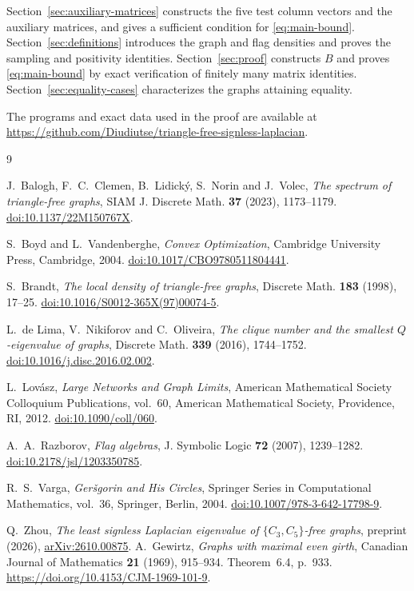 \documentclass[11pt]{article}
\begin{document}
Section~\ref{sec:auxiliary-matrices} constructs the five test column
vectors and the auxiliary matrices, and gives a sufficient condition
for \eqref{eq:main-bound}.
Section~\ref{sec:definitions} introduces the graph and flag densities
and proves the sampling and positivity identities.
Section~\ref{sec:proof} constructs $B$ and proves
\eqref{eq:main-bound} by exact verification of finitely many matrix
identities.
Section~\ref{sec:equality-cases} characterizes the graphs attaining equality.

The programs and exact data used in the proof are available at\newline
\url{https://github.com/Diudiutse/triangle-free-signless-laplacian}.





\FloatBarrier

\begin{thebibliography}{9}
\raggedright
{}
J.~Balogh, F.~C.~Clemen, B.~Lidick\'y, S.~Norin and J.~Volec,
\emph{The spectrum of triangle-free graphs},
SIAM J. Discrete Math. \textbf{37} (2023), 1173--1179.
\href{https://doi.org/10.1137/22M150767X}{doi:10.1137/22M150767X}.

S.~Boyd and L.~Vandenberghe, \emph{Convex Optimization},
Cambridge University Press, Cambridge, 2004.
\href{https://doi.org/10.1017/CBO9780511804441}{doi:10.1017/CBO9780511804441}.

S.~Brandt, \emph{The local density of triangle-free graphs},
Discrete Math. \textbf{183} (1998), 17--25.
\href{https://doi.org/10.1016/S0012-365X(97)00074-5}{doi:10.1016/S0012-365X(97)00074-5}.

L.~de Lima, V.~Nikiforov and C.~Oliveira,
\emph{The clique number and the smallest $Q$-eigenvalue of graphs},
Discrete Math. \textbf{339} (2016), 1744--1752.
\href{https://doi.org/10.1016/j.disc.2016.02.002}{doi:10.1016/j.disc.2016.02.002}.

L.~Lov\'asz, \emph{Large Networks and Graph Limits},
American Mathematical Society Colloquium Publications, vol.~60,
American Mathematical Society, Providence, RI, 2012.
\href{https://doi.org/10.1090/coll/060}{doi:10.1090/coll/060}.

A.~A.~Razborov, \emph{Flag algebras},
J. Symbolic Logic \textbf{72} (2007), 1239--1282.
\href{https://doi.org/10.2178/jsl/1203350785}{doi:10.2178/jsl/1203350785}.

R.~S.~Varga, \emph{Ger\v{s}gorin and His Circles},
Springer Series in Computational Mathematics, vol.~36,
Springer, Berlin, 2004.
\href{https://doi.org/10.1007/978-3-642-17798-9}{doi:10.1007/978-3-642-17798-9}.

Q.~Zhou, \emph{The least signless Laplacian eigenvalue of
$\{C_3,C_5\}$-free graphs}, preprint (2026),
\href{https://arxiv.org/abs/2610.00875}{arXiv:2610.00875}.
A.~Gewirtz,
\emph{Graphs with maximal even girth},
Canadian Journal of Mathematics \textbf{21} (1969), 915--934.
Theorem~6.4, p.~933.
\url{https://doi.org/10.4153/CJM-1969-101-9}.
\end{thebibliography}
\end{document}
